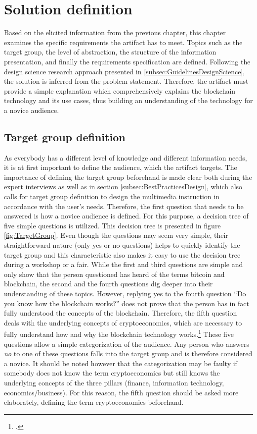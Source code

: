 \chapter{Solution definition} \label{chapter:Solution}

Based on the elicited information from the previous chapter, this chapter examines the specific requirements the artifact has to meet. Topics such as the target group, the level of abstraction, the structure of the information presentation, and finally the requirements specification are defined. Following the design science research approach presented in \ref{subsec:GuidelinesDesignScience}, the solution is inferred from the problem statement. Therefore, the artifact must provide a simple explanation which comprehensively explains the blockchain technology and its use cases, thus building an understanding of the technology for a novice audience. 

\section{Target group definition}
As everybody has a different level of knowledge and different information needs, it is at first important to define the audience, which the artifact targets. The importance of defining the target group beforehand is made clear both during the expert interviews as well as in section \ref{subsec:BestPracticesDesign}, which also calls for target group definition to design the multimedia instruction in accordance with the user's needs. Therefore, the first question that needs to be answered is how a novice audience is defined. For this purpose, a decision tree of five simple questions is utilized. This decision tree is presented in figure \ref{fig:TargetGroup}. Even though the questions may seem very simple, their straightforward nature (only yes or no questions) helps to quickly identify the target group and this characteristic also makes it easy to use the decision tree during a workshop or a fair. While the first and third questions are simple and only show that the person questioned has heard of the terms bitcoin and blockchain, the second and the fourth questions dig deeper into their understanding of these topics. However, replying yes to the fourth question \enquote{Do you know how the blockchain works?} does not prove that the person has in fact fully understood the concepts of the blockchain. Therefore, the fifth question deals with the underlying concepts of cryptoeconomics, which are necessary to fully understand how and why the blockchain technology works.\footcite[Cf.][]{RalphBeckmann_Interview} These five questions allow a simple categorization of the audience. Any person who answers \textit{no} to one of these questions falls into the target group and is therefore considered a novice. It should be noted however that the categorization may be faulty if somebody does not know the term cryptoeconomics but still knows the underlying concepts of the three pillars (finance, information technology, economics/business). For this reason, the fifth question should be asked more elaborately, defining the term cryptoeconomics beforehand.

